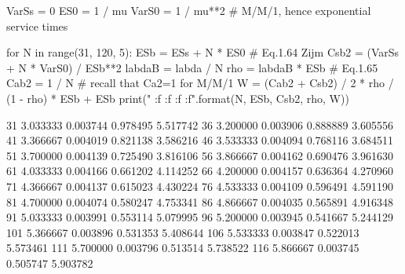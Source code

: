 
VarSs = 0
ES0 = 1 / mu
VarS0 = 1 / mu**2  # M/M/1, hence exponential service times

for N in range(31, 120, 5):
    ESb = ESs + N * ES0  # Eq.1.64 Zijm
    Csb2 = (VarSs + N * VarS0) / ESb**2
    labdaB = labda / N
    rho = labdaB * ESb  # Eq.1.65
    Cab2 = 1 / N  # recall that Ca2=1 for M/M/1
    W = (Cab2 + Csb2) / 2 * rho / (1 - rho) * ESb + ESb
    print("{} {:f} {:f} {:f} {:f}".format(N, ESb, Csb2, rho, W))

31 3.033333 0.003744 0.978495 5.517742
36 3.200000 0.003906 0.888889 3.605556
41 3.366667 0.004019 0.821138 3.586216
46 3.533333 0.004094 0.768116 3.684511
51 3.700000 0.004139 0.725490 3.816106
56 3.866667 0.004162 0.690476 3.961630
61 4.033333 0.004166 0.661202 4.114252
66 4.200000 0.004157 0.636364 4.270960
71 4.366667 0.004137 0.615023 4.430224
76 4.533333 0.004109 0.596491 4.591190
81 4.700000 0.004074 0.580247 4.753341
86 4.866667 0.004035 0.565891 4.916348
91 5.033333 0.003991 0.553114 5.079995
96 5.200000 0.003945 0.541667 5.244129
101 5.366667 0.003896 0.531353 5.408644
106 5.533333 0.003847 0.522013 5.573461
111 5.700000 0.003796 0.513514 5.738522
116 5.866667 0.003745 0.505747 5.903782

